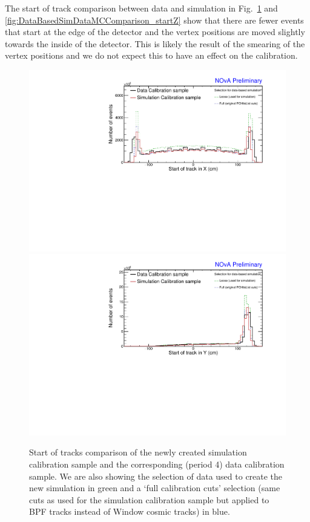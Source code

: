 The start of track comparison between data and simulation in Fig.~\ref{fig:DataBasedSimDataMCComparison_startXstartY} and \ref{fig:DataBasedSimDataMCComparison_startZ} show that there are fewer events that start at the edge of the detector and the vertex positions are moved slightly towards the inside of the detector. This is likely the result of the smearing of the vertex positions and we do not expect this to have an effect on the calibration. 

\begin{figure}[!ht]
\includegraphics[width=\textwidth]{Plots/TBCalibration/DBSim_DataMCComparison_StartX.pdf}
\includegraphics[width=\textwidth]{Plots/TBCalibration/DBSim_DataMCComparison_StartY.pdf}
\caption[Data-Simulation comparison of track start distributions]{Start of tracks comparison of the newly created simulation calibration sample and the corresponding (period 4) data calibration sample. We are also showing the selection of data used to create the new simulation in green and a `full calibration cuts' selection (same cuts as used for the simulation calibration sample but applied to \acrshort{BPF} tracks instead of Window cosmic tracks) in blue.}
\label{fig:DataBasedSimDataMCComparison_startXstartY}
\end{figure}

